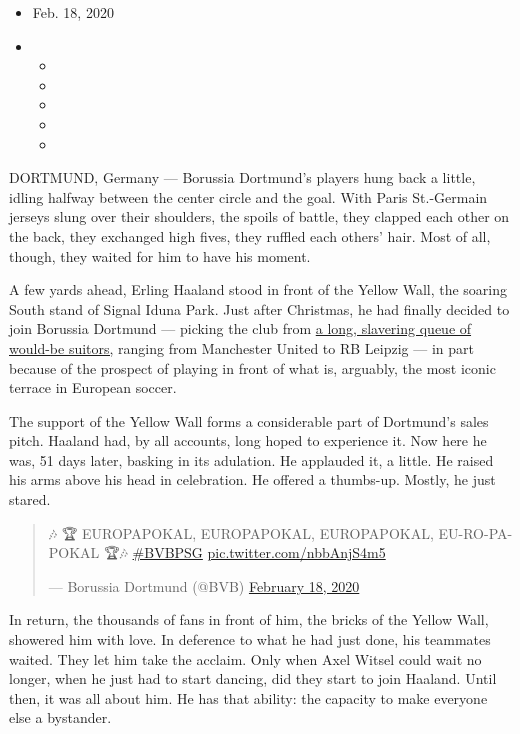 \begin{itemize}
\item
  Feb. 18, 2020
\item
  \begin{itemize}
  \item
  \item
  \item
  \item
  \item
  \end{itemize}
\end{itemize}

DORTMUND, Germany --- Borussia Dortmund's players hung back a little,
idling halfway between the center circle and the goal. With Paris
St.-Germain jerseys slung over their shoulders, the spoils of battle,
they clapped each other on the back, they exchanged high fives, they
ruffled each others' hair. Most of all, though, they waited for him to
have his moment.

A few yards ahead, Erling Haaland stood in front of the Yellow Wall, the
soaring South stand of Signal Iduna Park. Just after Christmas, he had
finally decided to join Borussia Dortmund --- picking the club from
\href{https://www.nytimes3xbfgragh.onion/2020/01/04/sports/soccer/how-to-buy-say-youll-sell.html}{a
long, slavering queue of would-be suitors,} ranging from Manchester
United to RB Leipzig --- in part because of the prospect of playing in
front of what is, arguably, the most iconic terrace in European soccer.

The support of the Yellow Wall forms a considerable part of Dortmund's
sales pitch. Haaland had, by all accounts, long hoped to experience it.
Now here he was, 51 days later, basking in its adulation. He applauded
it, a little. He raised his arms above his head in celebration. He
offered a thumbs-up. Mostly, he just stared.

\begin{quote}
🎶 🏆 EUROPAPOKAL, EUROPAPOKAL, EUROPAPOKAL, EU-RO-PA-POKAL 🏆🎶
\href{https://twitter.com/hashtag/BVBPSG?src=hash\&ref_src=twsrc\%5Etfw}{\#BVBPSG}
\href{https://t.co/nbbAnjS4m5}{pic.twitter.com/nbbAnjS4m5}

--- Borussia Dortmund (@BVB)
\href{https://twitter.com/BVB/status/1229887057977380864?ref_src=twsrc\%5Etfw}{February
18, 2020}
\end{quote}

In return, the thousands of fans in front of him, the bricks of the
Yellow Wall, showered him with love. In deference to what he had just
done, his teammates waited. They let him take the acclaim. Only when
Axel Witsel could wait no longer, when he just had to start dancing, did
they start to join Haaland. Until then, it was all about him. He has
that ability: the capacity to make everyone else a bystander.

